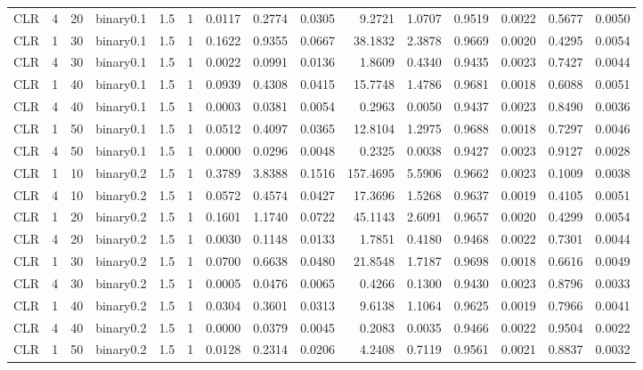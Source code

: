 \begin{longtable}{rrrrrrrrrrrrrrr}
  CLR & 4 & 20 & binary0.1 & 1.5 & 1 & 0.0117 & 0.2774 & 0.0305 & 9.2721 & 1.0707 & 0.9519 & 0.0022 & 0.5677 & 0.0050 \\ 
  CLR & 1 & 30 & binary0.1 & 1.5 & 1 & 0.1622 & 0.9355 & 0.0667 & 38.1832 & 2.3878 & 0.9669 & 0.0020 & 0.4295 & 0.0054 \\ 
  CLR & 4 & 30 & binary0.1 & 1.5 & 1 & 0.0022 & 0.0991 & 0.0136 & 1.8609 & 0.4340 & 0.9435 & 0.0023 & 0.7427 & 0.0044 \\ 
  CLR & 1 & 40 & binary0.1 & 1.5 & 1 & 0.0939 & 0.4308 & 0.0415 & 15.7748 & 1.4786 & 0.9681 & 0.0018 & 0.6088 & 0.0051 \\ 
  CLR & 4 & 40 & binary0.1 & 1.5 & 1 & 0.0003 & 0.0381 & 0.0054 & 0.2963 & 0.0050 & 0.9437 & 0.0023 & 0.8490 & 0.0036 \\ 
  CLR & 1 & 50 & binary0.1 & 1.5 & 1 & 0.0512 & 0.4097 & 0.0365 & 12.8104 & 1.2975 & 0.9688 & 0.0018 & 0.7297 & 0.0046 \\ 
  CLR & 4 & 50 & binary0.1 & 1.5 & 1 & 0.0000 & 0.0296 & 0.0048 & 0.2325 & 0.0038 & 0.9427 & 0.0023 & 0.9127 & 0.0028 \\ 
  CLR & 1 & 10 & binary0.2 & 1.5 & 1 & 0.3789 & 3.8388 & 0.1516 & 157.4695 & 5.5906 & 0.9662 & 0.0023 & 0.1009 & 0.0038 \\ 
  CLR & 4 & 10 & binary0.2 & 1.5 & 1 & 0.0572 & 0.4574 & 0.0427 & 17.3696 & 1.5268 & 0.9637 & 0.0019 & 0.4105 & 0.0051 \\ 
  CLR & 1 & 20 & binary0.2 & 1.5 & 1 & 0.1601 & 1.1740 & 0.0722 & 45.1143 & 2.6091 & 0.9657 & 0.0020 & 0.4299 & 0.0054 \\ 
  CLR & 4 & 20 & binary0.2 & 1.5 & 1 & 0.0030 & 0.1148 & 0.0133 & 1.7851 & 0.4180 & 0.9468 & 0.0022 & 0.7301 & 0.0044 \\ 
  CLR & 1 & 30 & binary0.2 & 1.5 & 1 & 0.0700 & 0.6638 & 0.0480 & 21.8548 & 1.7187 & 0.9698 & 0.0018 & 0.6616 & 0.0049 \\ 
  CLR & 4 & 30 & binary0.2 & 1.5 & 1 & 0.0005 & 0.0476 & 0.0065 & 0.4266 & 0.1300 & 0.9430 & 0.0023 & 0.8796 & 0.0033 \\ 
  CLR & 1 & 40 & binary0.2 & 1.5 & 1 & 0.0304 & 0.3601 & 0.0313 & 9.6138 & 1.1064 & 0.9625 & 0.0019 & 0.7966 & 0.0041 \\ 
  CLR & 4 & 40 & binary0.2 & 1.5 & 1 & 0.0000 & 0.0379 & 0.0045 & 0.2083 & 0.0035 & 0.9466 & 0.0022 & 0.9504 & 0.0022 \\ 
  CLR & 1 & 50 & binary0.2 & 1.5 & 1 & 0.0128 & 0.2314 & 0.0206 & 4.2408 & 0.7119 & 0.9561 & 0.0021 & 0.8837 & 0.0032 \\ 

\end{longtable}
